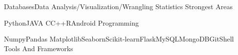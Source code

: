 

\begin{cventries}
  \cventry
    {Databases\quad\textbar\quad Data Analysis/Visualization/Wrangling \quad\textbar\quad 
    Statistics}  %
    {Strongest Areas} %
    {} %
    {} %
    {
    }

  \cventry
    {Python\quad\textbar\quad JAVA\quad\textbar\quad 
    C\quad\textbar\quad C++\quad\textbar\quad R\quad\textbar\quad Android}  %
    {Programming} %
    {} %
    {} %
    {
    }

  \cventry
    {Numpy\quad\textbar\quad Pandas\quad\textbar\quad 
    Matplotlib\quad\textbar\quad Seaborn\quad\textbar\quad Scikit-learn\quad\textbar\quad Flask\quad\textbar\quad MySQL\quad\textbar\quad MongoDB\quad\textbar\quad Git\quad\textbar\quad Shell}  %
    {Tools And Frameworks} %
    {} %
    {} %
    {
    }

\end{cventries}
